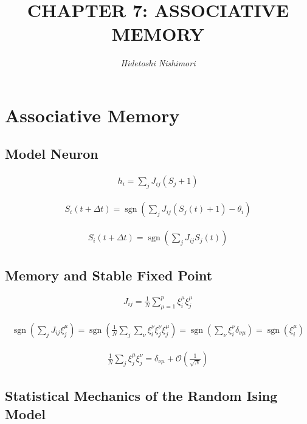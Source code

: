 \documentclass{article}
\title{\LARGE\scshape\MakeUppercase{Chapter 7: Associative Memory}}
\author{\textit{Hidetoshi Nishimori}}
\date{}  %
\begin{document}
\maketitle

\section{Associative Memory}

\subsection{Model Neuron}

\begin{align*}
h_i = \sum_{j} J_{ij} \left( S_j + 1 \right)
\tag{7.1}
\end{align*}

\begin{align*}
S_i(t + \Delta t) = \operatorname{sgn}\left( \sum_j J_{ij} \left( S_j(t) + 1 \right) - \theta_i \right)
\tag{7.2}
\end{align*}

\begin{align*}
S_i(t + \Delta t) = \operatorname{sgn}\left( \sum_j J_{ij} S_j(t) \right)
\tag{7.3}
\end{align*}

\subsection{Memory and Stable Fixed Point}

\begin{align*}
J_{ij} = \frac{1}{N} \sum_{\mu=1}^{p} \xi_i^{\mu} \xi_j^{\mu}\tag{7.4}
\end{align*}

\begin{align*}
\operatorname{sgn} \left( \sum_j J_{ij} \xi_j^{\mu} \right) = \operatorname{sgn} \left( \frac{1}{N} \sum_j \sum_{\nu} \xi_i^{\nu} \xi_j^{\nu} \xi_j^{\mu} \right) = \operatorname{sgn} \left( \sum_{\nu} \xi_i^{\nu} \delta_{\nu \mu} \right) = \operatorname{sgn} \left( \xi_i^{\mu} \right)
\tag{7.5}
\end{align*}

\begin{align*}
\frac{1}{N} \sum_j \xi_j^{\mu} \xi_j^{\nu} = \delta_{\nu \mu} + \mathcal{O}\left( \frac{1}{\sqrt{N}} \right)
\tag{7.6}
\end{align*}

\subsection{Statistical Mechanics of the Random Ising Model}
\end{document}
